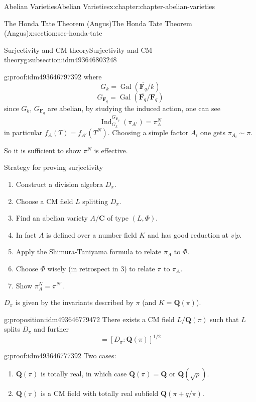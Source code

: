 \documentclass[oneside,10pt,]{book}
\numberwithin{equation}{section}
\newcommand{\QQ}{\mathbf{Q}}
\newcommand{\CC}{\mathbf{C}}
\newcommand{\FF}{\mathbf{F}}
\newcommand{\Gal}[2]{\operatorname{Gal}(#1/#2)}
\DeclareMathOperator{\Ind}{Ind}
\begin{document}
\begin{chapterptx}{Abelian Varieties}{}{Abelian Varieties}{}{}{x:chapter:chapter-abelian-varieties}
\begin{sectionptx}{The Honda Tate Theorem (Angus)}{}{The Honda Tate Theorem (Angus)}{}{}{x:section:sec-honda-tate}
\begin{subsectionptx}{Surjectivity and CM theory}{}{Surjectivity and CM theory}{}{}{g:subsection:idm493646803248}
\begin{proofptx}{}{g:proof:idm493646797392}
where%
\begin{equation*}
G_k = \Gal{\overline{\FF_q}}{k}
\end{equation*}
%
\begin{equation*}
G_{\FF_q} = \Gal{\overline{\FF_q}}{\FF_q}
\end{equation*}
since \(G_k\), \(G_{\FF_q}\) are abelian, by studying the induced action, one can see%
\begin{equation*}
\Ind_{G_k}^{G_{\FF_q}} (\pi_{A'}) = \pi_A^N
\end{equation*}
in particular \(f_A(T) = f_{A'}(T^N)\). Choosing a simple factor \(A_i\) one gets \(\pi_{A_i} \sim \pi\).%
\end{proofptx}
So it is sufficient to show \(\pi^N\) is effective.%
\par
Strategy for proving surjectivity%
\begin{enumerate}
\item{}Construct a division algebra \(D_\pi\).%
\item{}Choose a CM field \(L\) splitting \(D_\pi\).%
\item{}Find an abelian variety \(A/\CC\) of type \((L, \Phi)\).%
\item{}In fact \(A\) is defined over  a number field \(K\) and has good reduction at \(v|p\).%
\item{}Apply the Shimura-Taniyama formula to relate \(\pi_A\) to \(\Phi\).%
\item{}Choose \(\Phi\) wisely (in retrospect in 3) to relate \(\pi\) to \(\pi_A\).%
\item{}Show \(\pi_A^N = \pi^{N'}\).%
\end{enumerate}
%
\par
\(D_\pi\) is given by the invariants described by \(\pi\) (and \(K = \QQ(\pi)\)).%
\begin{proposition}{}{}{g:proposition:idm493646779472}%
There exists a CM field \(L/\QQ(\pi)\) such that \(L\) splits \(D_\pi\) and further%
\begin{equation*}
[L:\QQ(\pi) ] = [ D_\pi: \QQ(\pi)]^{1/2}
\end{equation*}
%
\end{proposition}
\begin{proofptx}{}{g:proof:idm493646777392}
Two cases:%
\begin{enumerate}
\item{}\(\QQ(\pi)\) is totally real, in which case \(\QQ(\pi) = \QQ\) or \(\QQ(\sqrt{p})\).%
\item{}\(\QQ(\pi)\) is a CM field with totally real subfield \(\QQ(\pi + q/\pi)\).%

\end{enumerate}
\end{proofptx}
\end{subsectionptx}
\end{sectionptx}
\end{chapterptx}
\end{document}

